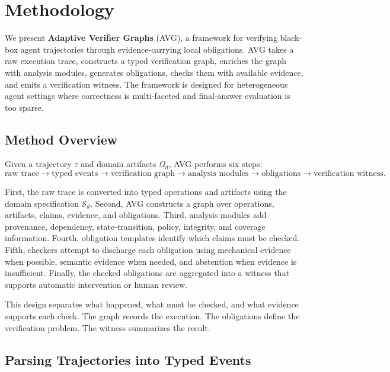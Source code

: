 \documentclass{article} %
\newcommand{\AVG}{\textsc{AVG}\xspace}
\begin{document}
\section{Methodology}
\label{sec:method}

We present \textbf{Adaptive Verifier Graphs} (\AVG), a framework for verifying black-box agent trajectories through evidence-carrying local obligations. \AVG takes a raw execution trace, constructs a typed verification graph, enriches the graph with analysis modules, generates obligations, checks them with available evidence, and emits a verification witness. The framework is designed for heterogeneous agent settings where correctness is multi-faceted and final-answer evaluation is too sparse.

\subsection{Method Overview}

Given a trajectory $\tau$ and domain artifacts $\Omega_d$, \AVG performs six steps:
\begin{equation}
\text{raw trace}
\rightarrow
\text{typed events}
\rightarrow
\text{verification graph}
\rightarrow
\text{analysis modules}
\rightarrow
\text{obligations}
\rightarrow
\text{verification witness}.
\end{equation}

First, the raw trace is converted into typed operations and artifacts using the domain specification $\mathcal{S}_d$. Second, \AVG constructs a graph over operations, artifacts, claims, evidence, and obligations. Third, analysis modules add provenance, dependency, state-transition, policy, integrity, and coverage information. Fourth, obligation templates identify which claims must be checked. Fifth, checkers attempt to discharge each obligation using mechanical evidence when possible, semantic evidence when needed, and abstention when evidence is insufficient. Finally, the checked obligations are aggregated into a witness that supports automatic intervention or human review.

This design separates what happened, what must be checked, and what evidence supports each check. The graph records the execution. The obligations define the verification problem. The witness summarizes the result.

\subsection{Parsing Trajectories into Typed Events}
\end{document}

